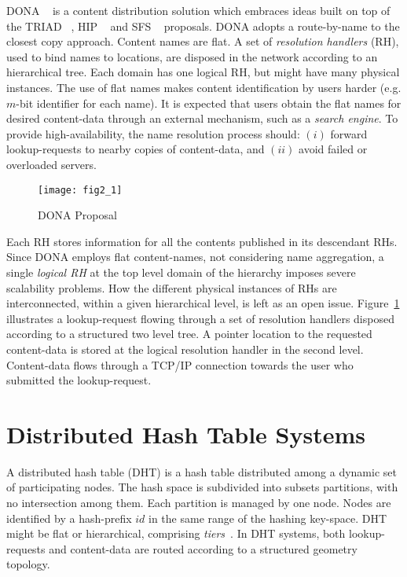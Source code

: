 DONA ~\cite{dona} is a content distribution solution which embraces ideas built on top of the 
TRIAD ~\cite{triad}, HIP ~\cite{hip} and SFS ~\cite{sfs} proposals. 
DONA adopts a route-by-name to the closest copy approach. Content names are flat. A set of 
\emph{resolution handlers} (RH), used to bind names to locations, are disposed in the network according to an hierarchical tree. Each domain 
has one logical RH, but might have  many physical instances. The use of flat names makes content identification by users
harder (e.g. $m$-bit identifier for each name). It is expected that users obtain the flat names for desired content-data 
through an external mechanism, such as a \emph{search engine}. To provide high-availability, the name resolution process should: 
$(i)$ forward lookup-requests to nearby copies of content-data, and $(ii)$ avoid failed or overloaded servers. 

\begin{figure}[h!]
\center
\texttt{[image: fig2\_1]}
\caption{DONA Proposal}
\label{donasystem}
\end{figure}


Each RH stores information for all the contents published in its descendant RHs. 
Since DONA employs flat content-names, not considering name aggregation, a 
single \emph{logical RH} at the top level domain of the hierarchy imposes severe scalability problems. How
the different physical instances of RHs are interconnected, within a given hierarchical level, is left as an open issue.
Figure~\ref{donasystem} illustrates a lookup-request flowing through a set of resolution handlers disposed according to a structured
two level tree. A pointer location to the requested content-data is stored at the logical 
resolution handler in the second level. Content-data flows through a TCP/IP connection towards the user who submitted
the lookup-request. 






\section{Distributed Hash Table Systems}


A distributed hash table (DHT) is a hash table distributed among a dynamic set of participating
nodes. The hash space is subdivided into subsets partitions, with no intersection among them. 
Each partition is managed by one node.  Nodes are identified by a hash-prefix $id$ in the same range of the hashing key-space. 
DHT might be flat or hierarchical, comprising \emph{tiers}~\cite{canon}.  In DHT systems, both lookup-requests 
and content-data are routed according to a structured geometry topology. 


